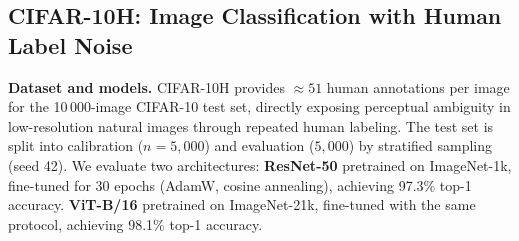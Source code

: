 \documentclass[10pt,journal,compsoc]{IEEEtran}
\begin{document}
\subsection{CIFAR-10H: Image Classification with Human Label Noise}
\label{sec:cifar10h}

\noindent\textbf{Dataset and models.}
CIFAR-10H \cite{peterson2019human} provides ${\approx}51$ human annotations per image for the 10\,000-image CIFAR-10 test set, directly exposing perceptual ambiguity in low-resolution natural images through repeated human labeling.  The test set is split into calibration ($n=5{,}000$) and evaluation ($5{,}000$) by stratified sampling (seed 42).  We evaluate two architectures:
\textbf{ResNet-50} \cite{he2016deep} pretrained on ImageNet-1k, fine-tuned for 30 epochs (AdamW, cosine annealing), achieving 97.3\% top-1 accuracy.
\textbf{ViT-B/16} \cite{dosovitskiy2021image} pretrained on ImageNet-21k, fine-tuned with the same protocol, achieving 98.1\% top-1 accuracy.
\end{document}
